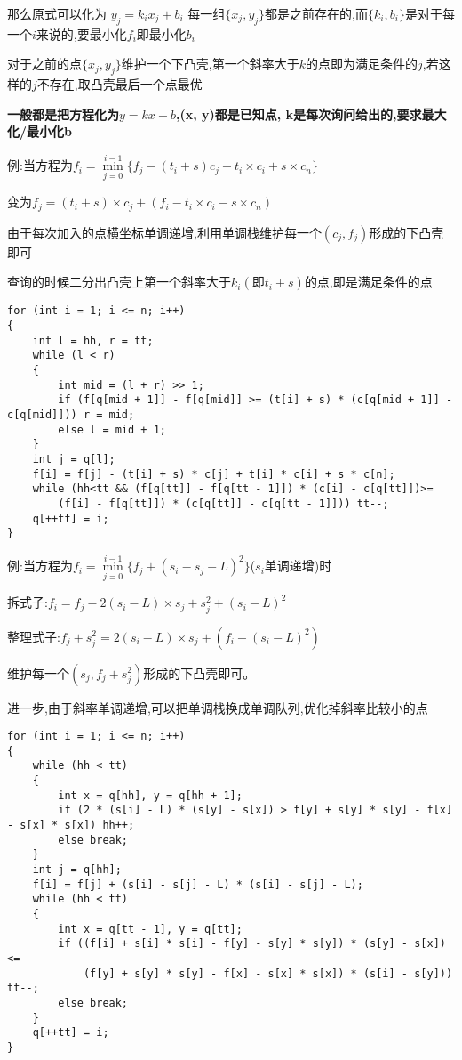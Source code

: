 \documentclass[a4paper, fontset=none]{ctexart}
\begin{document}
那么原式可以化为  $y_j=k_ix_j+b_i$ 每一组$\{x_j, y_j\}$都是之前存在的,而$\{k_i, b_i\}$是对于每一个$i$来说的,要最小化$f_i$即最小化$b_i$

对于之前的点$\{x_j, y_j\}$维护一个下凸壳,第一个斜率大于$k$的点即为满足条件的$j$,若这样的$j$不存在,取凸壳最后一个点最优

\textbf{一般都是把方程化为}$y=kx+b$\textbf{,(x, y)都是已知点, k是每次询问给出的,要求最大化/最小化b}

例:当方程为$f_i=\min\limits_{j=0}^{i-1}\{f_j-(t_i+s)c_j+t_i\times c_i+s\times c_n\}$

变为$f_j=(t_i+s) \times c_j+(f_i-t_i \times c_i-s\times c_n)$

由于每次加入的点横坐标单调递增,利用单调栈维护每一个$(c_j, f_j)$形成的下凸壳即可

查询的时候二分出凸壳上第一个斜率大于$k_i(即t_i+s)$的点,即是满足条件的点

\begin{verbatim}
for (int i = 1; i <= n; i++)
{
    int l = hh, r = tt;
    while (l < r)
    {
        int mid = (l + r) >> 1;
        if (f[q[mid + 1]] - f[q[mid]] >= (t[i] + s) * (c[q[mid + 1]] - c[q[mid]])) r = mid;
        else l = mid + 1;
    }
    int j = q[l];
    f[i] = f[j] - (t[i] + s) * c[j] + t[i] * c[i] + s * c[n];
    while (hh<tt && (f[q[tt]] - f[q[tt - 1]]) * (c[i] - c[q[tt]])>=
        (f[i] - f[q[tt]]) * (c[q[tt]] - c[q[tt - 1]])) tt--;
    q[++tt] = i;
}
\end{verbatim}

例:当方程为$f_i=\min\limits_{j=0}^{i-1}\{f_j+(s_i-s_j-L)^2\}$($s_i$单调递增)时

拆式子:$f_i=f_j-2(s_i-L)\times s_j+s_j ^ 2+(s_i-L)^2$

整理式子:$f_j+s_j ^ 2=2(s_i-L)\times s_j+(f_i-(s_i-L)^2)$

维护每一个$(s_j, f_j+s_j ^ 2)$形成的下凸壳即可。

进一步,由于斜率单调递增,可以把单调栈换成单调队列,优化掉斜率比较小的点


\begin{verbatim}
for (int i = 1; i <= n; i++)
{
    while (hh < tt)
    {
        int x = q[hh], y = q[hh + 1];
        if (2 * (s[i] - L) * (s[y] - s[x]) > f[y] + s[y] * s[y] - f[x] - s[x] * s[x]) hh++;
        else break;
    }
    int j = q[hh];
    f[i] = f[j] + (s[i] - s[j] - L) * (s[i] - s[j] - L);
    while (hh < tt)
    {
        int x = q[tt - 1], y = q[tt];
        if ((f[i] + s[i] * s[i] - f[y] - s[y] * s[y]) * (s[y] - s[x])<=
            (f[y] + s[y] * s[y] - f[x] - s[x] * s[x]) * (s[i] - s[y])) tt--;
        else break;
    }
    q[++tt] = i;
}
\end{verbatim}
\end{document}
